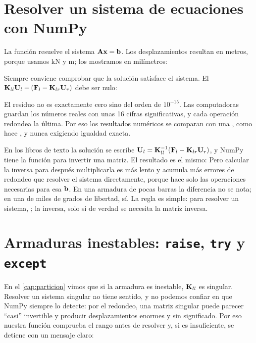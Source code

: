 \section{Resolver un sistema de ecuaciones con NumPy}\label{sec:solve}

La función  resuelve el sistema $\mathbf{A}\mathbf{x} =
\mathbf{b}$. Los desplazamientos resultan en metros, porque usamos
\si{\kilo\newton} y \si{\metre}; los mostramos en milímetros:

Siempre conviene comprobar que la solución satisface el sistema. El
 $\mathbf{K}_{ll}\mathbf{U}_l - (\mathbf{F}_l - \mathbf{K}_{lr}\mathbf{U}_r)$ debe
ser nulo:

El residuo no es exactamente cero sino del orden de $10^{-15}$. Las
computadoras guardan los números reales con unas 16 cifras significativas, y
cada operación redondea la última. Por eso los resultados numéricos se
comparan con una , como hace
, y nunca exigiendo igualdad exacta.

\begin{cuidado}
En los libros de texto la solución se escribe $\mathbf{U}_l = \mathbf{K}_{ll}^{-1}(\mathbf{F}_l
- \mathbf{K}_{lr}\mathbf{U}_r)$, y NumPy tiene la función  para invertir
una matriz. El resultado es el mismo:
Pero calcular la inversa para después multiplicarla es más lento y acumula
más errores de redondeo que resolver el sistema directamente, porque
 hace solo las operaciones necesarias para esa $\mathbf{b}$. En una
armadura de pocas barras la diferencia no se nota; en una de miles de grados
de libertad, sí. La regla es simple: para resolver un sistema, ;
la inversa, solo si de verdad se necesita la matriz inversa.
\end{cuidado}

\section{Armaduras inestables: \texttt{raise}, \texttt{try} y \texttt{except}}\label{sec:excepciones}

En el \cref{cap:particion} vimos que si la armadura es inestable, $\mathbf{K}_{ll}$
es singular. Resolver un sistema singular no tiene sentido, y no podemos
confiar en que NumPy siempre lo detecte: por el redondeo, una matriz singular
puede parecer \enquote{casi} invertible y producir desplazamientos enormes y
sin significado. Por eso nuestra función comprueba el rango antes de resolver
y, si es insuficiente, se detiene con un mensaje claro:

